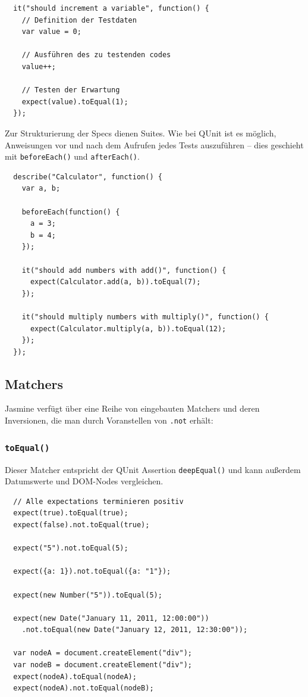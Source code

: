 \documentclass[11pt, a4paper]{article}
\begin{document}
\begin{verbatim}
  it("should increment a variable", function() {
    // Definition der Testdaten
    var value = 0;

    // Ausführen des zu testenden codes
    value++;

    // Testen der Erwartung
    expect(value).toEqual(1);
  });
\end{verbatim}

Zur Strukturierung der Specs dienen Suites. Wie bei QUnit ist es möglich,
Anweisungen vor und nach dem Aufrufen jedes Tests auszuführen -- dies geschieht
mit \texttt{beforeEach()} und \texttt{afterEach()}.

\begin{verbatim}
  describe("Calculator", function() {
    var a, b;

    beforeEach(function() {
      a = 3;
      b = 4;
    });

    it("should add numbers with add()", function() {
      expect(Calculator.add(a, b)).toEqual(7);
    });

    it("should multiply numbers with multiply()", function() {
      expect(Calculator.multiply(a, b)).toEqual(12);
    });
  });
\end{verbatim}

\clearpage

\subsection{Matchers}

Jasmine verfügt über eine Reihe von eingebauten Matchers und deren Inversionen,
die man durch Voranstellen von \texttt{.not} erhält:

\subsubsection*{\texttt{toEqual()}}

Dieser Matcher entspricht der QUnit Assertion \texttt{deepEqual()} und
kann außerdem Datumswerte und DOM-Nodes vergleichen.

\begin{verbatim}
  // Alle expectations terminieren positiv
  expect(true).toEqual(true);
  expect(false).not.toEqual(true);

  expect("5").not.toEqual(5);

  expect({a: 1}).not.toEqual({a: "1"});

  expect(new Number("5")).toEqual(5);

  expect(new Date("January 11, 2011, 12:00:00"))
    .not.toEqual(new Date("January 12, 2011, 12:30:00"));

  var nodeA = document.createElement("div");
  var nodeB = document.createElement("div");
  expect(nodeA).toEqual(nodeA);
  expect(nodeA).not.toEqual(nodeB);
\end{verbatim}
\end{document}
